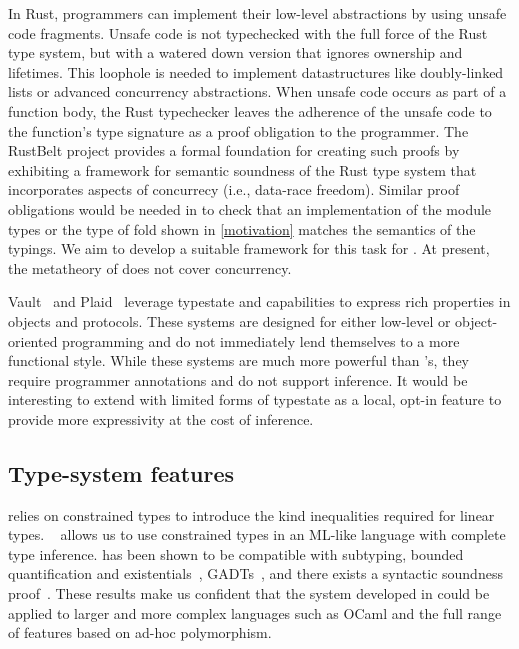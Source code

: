In Rust, programmers can implement their low-level abstractions by
using unsafe code fragments. Unsafe code is not typechecked with the
full force of the Rust type system, but with a watered down version
that ignores ownership and lifetimes. This loophole is needed to implement
datastructures like doubly-linked lists or advanced concurrency
abstractions. When unsafe code occurs as part of a 
function body, the Rust typechecker leaves the adherence of the unsafe
code to the function's type signature as a proof obligation to
the programmer. The RustBelt project
\cite{DBLP:journals/pacmpl/0002JKD18} provides a formal 
foundation for creating such proofs by exhibiting a framework for
semantic soundness of the Rust type system that incorporates aspects
of concurrecy (i.e., data-race freedom). Similar proof obligations
would be needed in \lang to check that an implementation of the module
types or the type of fold shown in \cref{motivation} matches the
semantics of the typings. We aim to develop a suitable framework for
this task for \lang. At present, the metatheory of \lang does not
cover concurrency.

Vault~\citep{DBLP:conf/pldi/DeLineF01}
and Plaid~\citep{DBLP:conf/oopsla/AldrichSSS09}
leverage typestate and capabilities
to express rich properties in objects and protocols.
These systems are designed for either low-level or object-oriented
programming and do not immediately lend themselves to a more functional
style. While these systems are much more
powerful than \affe's, they require programmer annotations
and do not support inference.
It  would be interesting to extend \lang with limited
forms of typestate as a local, opt-in feature to provide
more expressivity at the cost of inference.

\subsection{Type-system features}
%
\lang relies on constrained types
to introduce the kind inequalities required for linear types.
\hmx~\citep{DBLP:journals/tapos/OderskySW99} 
allows us to use constrained types in an ML-like language with complete
type inference.
\hmx has been shown to be compatible with subtyping,
bounded quantification and existentials~\citep{DBLP:conf/icfp/Simonet03},
GADTs~\citep{DBLP:journals/toplas/SimonetP07},
and there exists a syntactic soundness proof~\citep{DBLP:journals/entcs/SkalkaP02}.
These results make us confident that the system developed in \lang
could be applied to larger and more complex languages such as OCaml
and the full range of features based on ad-hoc polymorphism.

